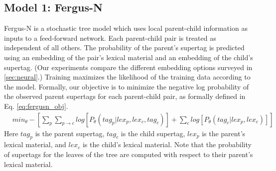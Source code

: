 \documentclass[11pt]{article}
\begin{document}
\subsection{Model 1: Fergus-N}

Fergus-N is a stochastic tree model which uses local parent-child information as inputs to a feed-forward network.
%
Each parent-child pair is treated as independent of all others.
%
The probability of the parent's supertag is predicted using an embedding of the pair's lexical material and an embedding of the child's supertag.
%
(Our experiments compare the different embedding options surveyed in
\ref{sec:neural}.) 
%
Training maximizes the likelihood of the training data according to
the model.
%
Formally, our objective is to minimize the negative log probability of
the observed parent supertags for each parent-child pair, as formally
defined in Eq. \ref{eq:fergusn_obj}.
%
\begin{align}
&min_{\theta} -[\sum_p\sum_{p\to c} log[P_\theta(tag_{p} | lex_{p}, lex_{c}, tag_{c})] + \sum_c log[P_\theta(tag_{c} |lex_{p}, lex_{c})]] \label{eq:fergusn_obj}
\end{align}
%
Here $tag_p$ is the parent
supertag, $tag_c$ is the child supertag, $lex_p$ is the parent's
lexical material, and $lex_c$ is the child's lexical material.
%
Note that the probability of supertags for the leaves of the tree are computed
with respect to their parent's lexical material.
\end{document}
